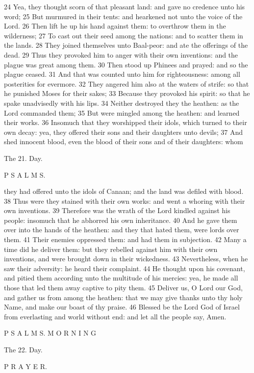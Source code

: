 24 Yea, they thought scorn of that pleasant land: and gave no credence unto his word; 25 But murmured in their tents: and hearkened not unto the voice of the Lord. 26 Then lift he up his hand against them: to overthrow them in the wilderness; 27 To cast out their seed among the nations: and to scatter them in the lands. 28 They joined themselves unto Baal-peor: and ate the offerings of the dead. 29 Thus they provoked him to anger with their own inventions: and the plague was great among them. 30 Then stood up Phinees and prayed: and so the plague ceased. 31 And that was counted unto him for righteousness: among all posterities for evermore. 32 They angered him also at the waters of strife: so that he punished Moses for their sakes; 33 Because they provoked his spirit: so that he spake unadvisedly with his lips. 34 Neither destroyed they the heathen: as the Lord commanded them; 35 But were mingled among the heathen: and learned their works. 36 Insomuch that they worshipped their idols, which turned to their own decay: yea, they offered their sons and their daughters unto devils; 37 And shed innocent blood, even the blood of their sons and of their daughters: whom

The 21. Day.

P S A L M S.

they had offered unto the idols of Canaan; and the land was defiled with blood. 38 Thus were they stained with their own works: and went a whoring with their own inventions. 39 Therefore was the wrath of the Lord kindled against his people: insomuch that he abhorred his own inheritance. 40 And he gave them over into the hands of the heathen: and they that hated them, were lords over them. 41 Their enemies oppressed them: and had them in subjection. 42 Many a time did he deliver them: but they rebelled against him with their own inventions, and were brought down in their wickedness. 43 Nevertheless, when he saw their adversity: he heard their complaint. 44 He thought upon his covenant, and pitied them according unto the multitude of his mercies: yea, he made all those that led them away captive to pity them. 45 Deliver us, O Lord our God, and gather us from among the heathen: that we may give thanks unto thy holy Name, and make our boast of thy praise. 46 Blessed be the Lord God of Israel from everlasting and world without end: and let all the people say, Amen.

P S A L M S. M O R N I N G

The 22. Day.

P R A Y E R.

